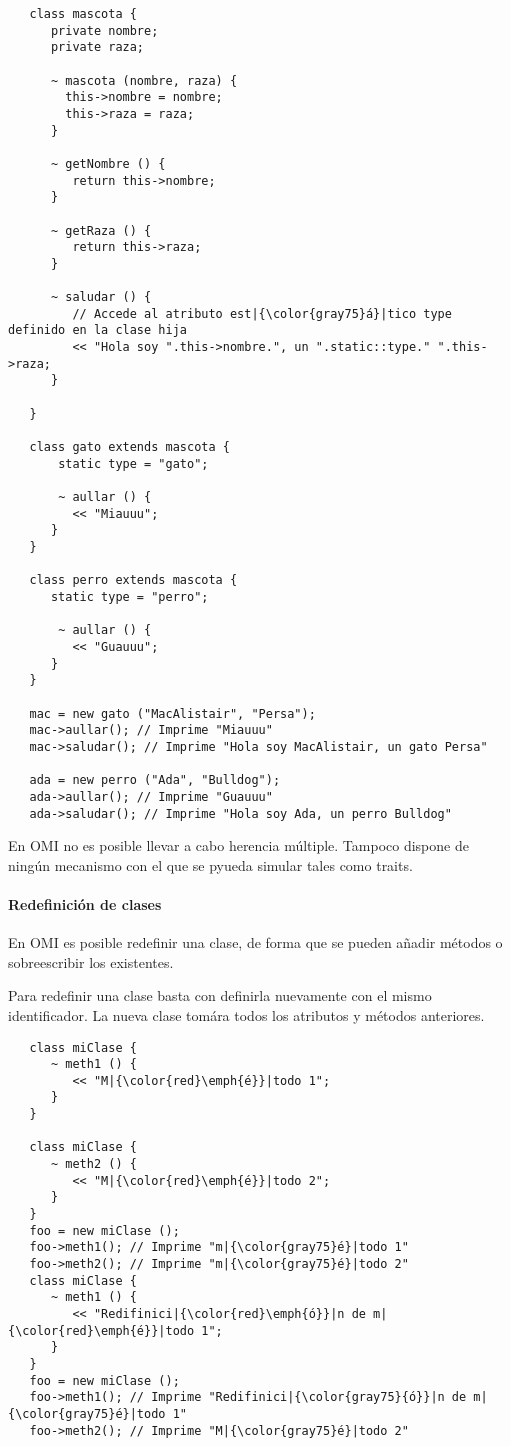 \begin{lstlisting}
   class mascota {
      private nombre; 
      private raza;
      
      ~ mascota (nombre, raza) { 
        this->nombre = nombre; 
        this->raza = raza;
      }
      
      ~ getNombre () {
         return this->nombre;
      }
      
      ~ getRaza () {
         return this->raza;
      }
      
      ~ saludar () {
         // Accede al atributo est|{\color{gray75}á}|tico type definido en la clase hija
         << "Hola soy ".this->nombre.", un ".static::type." ".this->raza;  
      }
      
   }

   class gato extends mascota {
       static type = "gato";
       
       ~ aullar () { 
         << "Miauuu";
      }
   }

   class perro extends mascota {
      static type = "perro";
       
       ~ aullar () { 
         << "Guauuu";
      }
   }
   
   mac = new gato ("MacAlistair", "Persa"); 
   mac->aullar(); // Imprime "Miauuu"
   mac->saludar(); // Imprime "Hola soy MacAlistair, un gato Persa"
   
   ada = new perro ("Ada", "Bulldog"); 
   ada->aullar(); // Imprime "Guauuu"
   ada->saludar(); // Imprime "Hola soy Ada, un perro Bulldog"

\end{lstlisting}



En OMI no es posible llevar a cabo herencia múltiple. Tampoco dispone de ningún
mecanismo con el que se pyueda simular tales como traits. 

\paragraph{Redefinición de clases}
En OMI es posible redefinir una clase, de forma que se pueden añadir métodos o sobreescribir los 
existentes. 

Para redefinir una clase basta con definirla nuevamente con el mismo identificador. La nueva 
clase tomára todos los atributos y métodos anteriores. \\

\begin{lstlisting}
   class miClase {
      ~ meth1 () {
         << "M|{\color{red}\emph{é}}|todo 1";
      }
   }
   
   class miClase {
      ~ meth2 () {
         << "M|{\color{red}\emph{é}}|todo 2";
      }
   }
   foo = new miClase ();
   foo->meth1(); // Imprime "m|{\color{gray75}é}|todo 1"
   foo->meth2(); // Imprime "m|{\color{gray75}é}|todo 2"
   class miClase {
      ~ meth1 () {
         << "Redifinici|{\color{red}\emph{ó}}|n de m|{\color{red}\emph{é}}|todo 1";
      }
   }
   foo = new miClase ();
   foo->meth1(); // Imprime "Redifinici|{\color{gray75}{ó}}|n de m|{\color{gray75}é}|todo 1"
   foo->meth2(); // Imprime "M|{\color{gray75}é}|todo 2"
\end{lstlisting}

